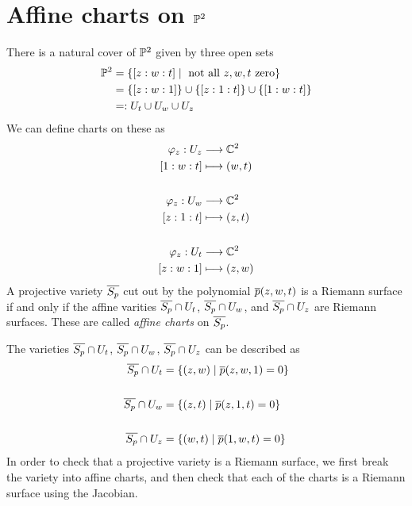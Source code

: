 \documentclass{article}
\begin{document}
\section{Affine charts on $\mathbb{P}^2$}
There is a natural cover of $\mathbb{P}^2$ given by three open sets
\begin{align*}
  \mathbb{P}^2
  &= \left\{[z : w : t] \mid \mbox{ not all } z,w,t \mbox{ zero}\right\} \\
  &= \left\{[z : w : 1]\right\} \cup \left\{[z : 1 : t]\right\} \cup \left\{[1 : w : t]\right\} \\
  &=: U_t \cup U_w \cup U_z
\end{align*}
We can define charts on these as
\begin{align*}
  \varphi_z: U_z &\longrightarrow \mathbb{C}^2 \\
  [1 : w : t] &\longmapsto (w,t)\\\\
  \varphi_z: U_w &\longrightarrow \mathbb{C}^2 \\
  [z : 1 : t] &\longmapsto (z,t)\\\\
  \varphi_z: U_t &\longrightarrow \mathbb{C}^2 \\
  [z : w : 1] &\longmapsto (z,w)
\end{align*}
A projective variety $\overline{S_p}$ cut out by the polynomial $\overline{p}(z,w,t)$ is a Riemann surface if and only if the affine varities $\overline{S_p} \cap U_t$, $\overline{S_p} \cap U_w$, and $\overline{S_p} \cap U_z$ are Riemann surfaces.
These are called \emph{affine charts} on $\overline{S_p}$.

The varieties
$\overline{S_p} \cap U_t$, $\overline{S_p} \cap U_w$, $\overline{S_p} \cap U_z$
can be described as
\begin{align*}
  \overline{S_p} \cap U_t
  &= \left\{(z,w) \mid \overline{p}(z,w,1) = 0\right\} \\\\
  \overline{S_p} \cap U_w
  &= \left\{(z,t) \mid \overline{p}(z,1,t) = 0\right\} \\\\
  \overline{S_p} \cap U_z
  &= \left\{(w,t) \mid \overline{p}(1,w,t) = 0\right\}
\end{align*}
In order to check that a projective variety is a Riemann surface, we first break the variety into affine charts, and then check that each of the charts is a Riemann surface using the Jacobian.
\end{document}
